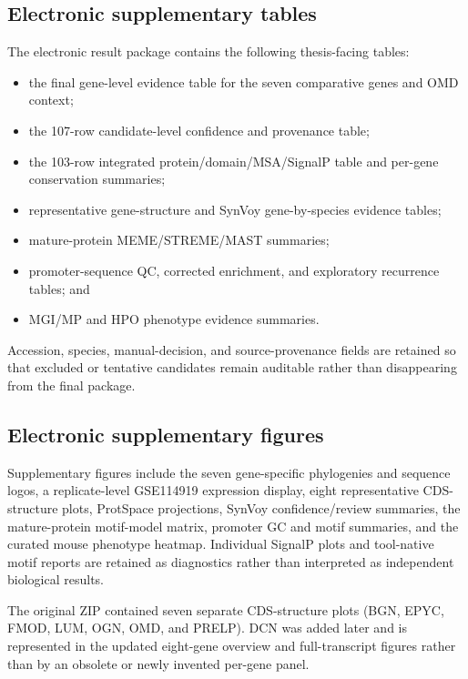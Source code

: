 \subsection{Electronic supplementary tables}

The electronic result package contains the following thesis-facing tables:

\begin{itemize}
    \item the final gene-level evidence table for the seven comparative genes
    and OMD context;
    \item the 107-row candidate-level confidence and provenance table;
    \item the 103-row integrated protein/domain/MSA/SignalP table and per-gene
    conservation summaries;
    \item representative gene-structure and SynVoy gene-by-species evidence
    tables;
    \item mature-protein MEME/STREME/MAST summaries;
    \item promoter-sequence QC, corrected enrichment, and exploratory recurrence
    tables; and
    \item MGI/MP and HPO phenotype evidence summaries.
\end{itemize}

Accession, species, manual-decision, and source-provenance fields are retained so
that excluded or tentative candidates remain auditable rather than disappearing
from the final package.

\subsection{Electronic supplementary figures}

Supplementary figures include the seven gene-specific phylogenies and sequence
logos, a replicate-level GSE114919 expression display, eight representative
CDS-structure plots, ProtSpace projections, SynVoy
confidence/review summaries, the mature-protein motif-model matrix, promoter GC
and motif summaries, and the curated mouse phenotype heatmap. Individual
SignalP plots and tool-native motif reports are retained as diagnostics rather
than interpreted as independent biological results.

The original ZIP contained seven separate CDS-structure plots (BGN, EPYC, FMOD,
LUM, OGN, OMD, and PRELP). DCN was added later and is represented in the updated
eight-gene overview and full-transcript figures rather than by an obsolete or
newly invented per-gene panel.

